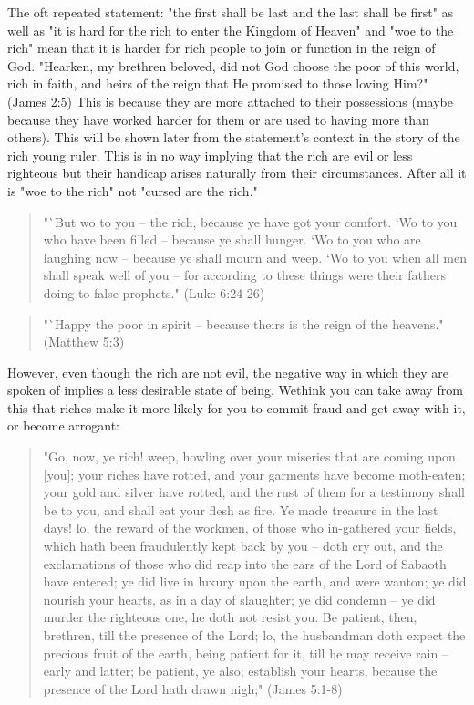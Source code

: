 \documentclass[11pt]{article}
\begin{document}
The oft repeated statement: "the first shall be last and the last shall be first" as well as "it is hard for the rich to enter the Kingdom of Heaven" and "woe to the rich" mean that it is harder for rich people to join or function in the reign of God. "Hearken, my brethren beloved, did not God choose the poor of this world, rich in faith, and heirs of the reign that He promised to those loving Him?" (James 2:5) This is because they are more attached to their possessions (maybe because they have worked harder for them or are used to having more than others). This will be shown later from the statement's context in the story of the rich young ruler. This is in no way implying that the rich are evil or less righteous but their handicap arises naturally from their circumstances. After all it is "woe to the rich" not "cursed are the rich."
\begin{quote}
"`But wo to you -- the rich, because ye have got your comfort.
`Wo to you who have been filled -- because ye shall hunger. `Wo to you who are laughing now -- because ye shall mourn and weep.
`Wo to you when all men shall speak well of you -- for according to these things were their fathers doing to false prophets." (Luke 6:24-26)
\end{quote}
\begin{quote}
"`Happy the poor in spirit -- because theirs is the reign of the heavens." (Matthew 5:3) 
\end{quote}
However, even though the rich are not evil, the negative way in which they are spoken of implies a less desirable state of being. Wethink you can take away from this that riches make it more likely for you to commit fraud and get away with it, or become arrogant:
\begin{quote}
"Go, now, ye rich! weep, howling over your miseries that are coming upon [you];
your riches have rotted, and your garments have become moth-eaten;
your gold and silver have rotted, and the rust of them for a testimony shall be to you, and shall eat your flesh as fire. Ye made treasure in the last days!
lo, the reward of the workmen, of those who in-gathered your fields, which hath been fraudulently kept back by you -- doth cry out, and the exclamations of those who did reap into the ears of the Lord of Sabaoth have entered;
ye did live in luxury upon the earth, and were wanton; ye did nourish your hearts, as in a day of slaughter;
ye did condemn -- ye did murder the righteous one, he doth not resist you.
Be patient, then, brethren, till the presence of the Lord; lo, the husbandman doth expect the precious fruit of the earth, being patient for it, till he may receive rain -- early and latter;
be patient, ye also; establish your hearts, because the presence of the Lord hath drawn nigh;" (James 5:1-8)
\end{quote}
\end{document}
